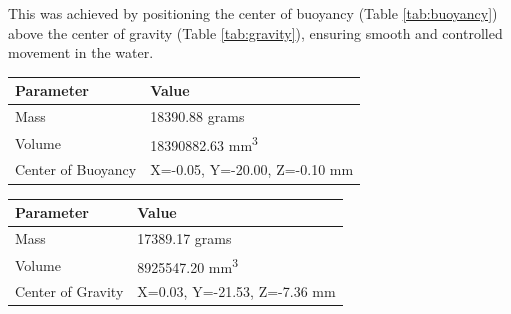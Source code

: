 \vspace{-0.3cm}

This was achieved by positioning the center of buoyancy (Table \ref{tab:buoyancy}) above the center of gravity (Table \ref{tab:gravity}), ensuring smooth and controlled movement in the water.

\vspace{-0.7cm}
\begin{center}
\begin{adjustbox}{width=\columnwidth}
    \begin{minipage}[t]{0.48\columnwidth}
    \centering
    \begin{adjustbox}{width=\textwidth, height=0.8cm}
    \renewcommand{\arraystretch}{1.2}
    \begin{tabular}{|l|l|}
    \hline
    \textbf{Parameter} & \textbf{Value} \\
    \hline
    Mass & 18390.88 grams \\
    Volume & 18390882.63 mm\textsuperscript{3} \\
    Center of Buoyancy & X=-0.05, Y=-20.00, Z=-0.10 mm \\
    \hline
    \end{tabular}
    \end{adjustbox}
    \renewcommand{\captionfont}{\footnotesize}
    \renewcommand{\captionfont}{\normalsize}
    \label{tab:buoyancy}
    \end{minipage}
    \hfill
    \begin{minipage}[t]{0.48\columnwidth}
    \centering
    \begin{adjustbox}{width=\textwidth, height=0.8cm}
    \renewcommand{\arraystretch}{1.2}
    \begin{tabular}{|l|l|}
    \hline
    \textbf{Parameter} & \textbf{Value} \\
    \hline
    Mass & 17389.17 grams \\
    Volume & 8925547.20 mm\textsuperscript{3} \\
    Center of Gravity & X=0.03, Y=-21.53, Z=-7.36 mm \\
    \hline
    \end{tabular}
    \end{adjustbox}
    \renewcommand{\captionfont}{\footnotesize}
    \renewcommand{\captionfont}{\normalsize}
    \label{tab:gravity}
    \end{minipage}
\end{adjustbox}
\end{center}

